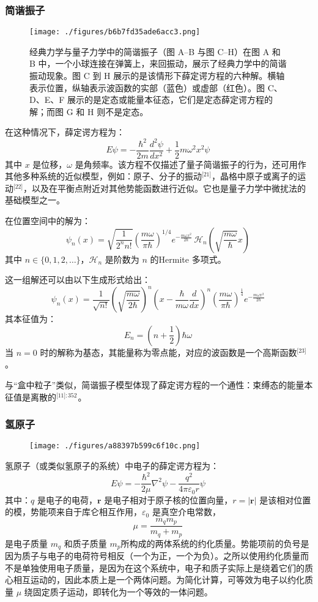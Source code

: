\subsubsection{简谐振子}
\begin{figure}[ht]
\centering
\texttt{[image: ./figures/b6b7fd35ade6acc3.png]}
\caption{经典力学与量子力学中的简谐振子（图 A–B 与图 C–H）在图 A 和 B 中，一个小球连接在弹簧上，来回振动，展示了经典力学中的简谐振动现象。图 C 到 H 展示的是该情形下薛定谔方程的六种解。横轴表示位置，纵轴表示波函数的实部（蓝色）或虚部（红色）。图 C、D、E、F 展示的是定态或能量本征态，它们是定态薛定谔方程的解；而图 G 和 H 则不是定态。} \label{fig_XDEfc_4}
\end{figure}
在这种情况下，薛定谔方程为：
$$
E\psi = -\frac{\hbar^2}{2m} \frac{d^2\psi}{dx^2} + \frac{1}{2} m \omega^2 x^2 \psi~
$$
其中 $x$ 是位移，$\omega$ 是角频率。该方程不仅描述了量子简谐振子的行为，还可用作其他多种系统的近似模型，例如：原子、分子的振动\(^\text{[21]}\)，晶格中原子或离子的运动\(^\text{[22]}\)，以及在平衡点附近对其他势能函数进行近似。它也是量子力学中微扰法的基础模型之一。

在位置空间中的解为：
$$
\psi_n(x) = \sqrt{\frac{1}{2^n n!}} \left( \frac{m\omega}{\pi \hbar} \right)^{1/4} e^{- \frac{m\omega x^2}{2\hbar}} \, \mathcal{H}_n \left( \sqrt{\frac{m\omega}{\hbar}} x \right)~
$$
其中 $n \in \{0, 1, 2, \ldots\}$，$\mathcal{H}_n$ 是阶数为 $n$ 的Hermite 多项式。

这一组解还可以由以下生成形式给出：
$$
\psi_n(x) = \frac{1}{\sqrt{n!}} \left( \sqrt{ \frac{m\omega}{2\hbar} } \right)^n \left( x - \frac{\hbar}{m\omega} \frac{d}{dx} \right)^n \left( \frac{m\omega}{\pi\hbar} \right)^{\frac{1}{4}} e^{- \frac{m\omega x^2}{2\hbar}}~
$$
其本征值为：
$$
E_n = \left(n + \frac{1}{2} \right) \hbar \omega~
$$
当 $n = 0$ 时的解称为基态，其能量称为零点能，对应的波函数是一个高斯函数\(^\text{[23]}\)。

与“盒中粒子”类似，简谐振子模型体现了薛定谔方程的一个通性：束缚态的能量本征值是离散的\(^\text{[11]: 352 }\)。
\subsubsection{氢原子}
\begin{figure}[ht]
\centering
\texttt{[image: ./figures/a88397b599c6f10c.png]}
\caption{} \label{fig_XDEfc_5}
\end{figure}
氢原子（或类似氢原子的系统）中电子的薛定谔方程为：
$$
E \psi = -\frac{\hbar^2}{2\mu} \nabla^2 \psi - \frac{q^2}{4\pi \varepsilon_0 r} \psi~
$$
其中：$q$ 是电子的电荷，$\mathbf{r}$ 是电子相对于原子核的位置向量，$r = |\mathbf{r}|$ 是该相对位置的模，势能项来自于库仑相互作用，$\varepsilon_0$ 是真空介电常数，
$$
\mu = \frac{m_q m_p}{m_q + m_p}~
$$
是电子质量 $m_q$ 和质子质量 $m_p$所构成的两体系统的约化质量。势能项前的负号是因为质子与电子的电荷符号相反（一个为正，一个为负）。之所以使用约化质量而不是单独使用电子质量，是因为在这个系统中，电子和质子实际上是绕着它们的质心相互运动的，因此本质上是一个两体问题。为简化计算，可等效为电子以约化质量 $\mu$ 绕固定质子运动，即转化为一个等效的一体问题。

